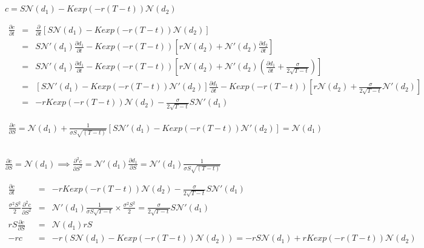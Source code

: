 \documentclass[11pt, fleqn]{article}
\begin{document}
\subsection{}
$c = S\mathcal{N}(d_1) - Kexp(-r(T-t))\mathcal{N}(d_2)$

\begin{eqnarray*}
\frac{\partial c}{\partial t} &=& \frac{\partial}{\partial t}[S\mathcal{N}(d_1) - Kexp(-r(T-t))\mathcal{N}(d_2)] \\
&=& S\mathcal{N}'(d_1)\frac{\partial d_1}{\partial t} - Kexp(-r(T-t))[r\mathcal{N}(d_2) + \mathcal{N}'(d_2)\frac{\partial d_2}{\partial t}]\\
&=& S\mathcal{N}'(d_1)\frac{\partial d_1}{\partial t} - Kexp(-r(T-t))[r\mathcal{N}(d_2) + \mathcal{N}'(d_2)(\frac{\partial d_1}{\partial t} + \frac{\sigma}{2\sqrt{T-t}})]\\
&=& [S\mathcal{N}'(d_1) - Kexp(-r(T-t))\mathcal{N}'(d_2)]\frac{\partial d_1}{\partial t} - Kexp(-r(T-t))[r\mathcal{N}(d_2) + \frac{\sigma}{2\sqrt{T-t}}\mathcal{N}'(d_2)]\\
&=& -rKexp(-r(T-t))\mathcal{N}(d_2) - \frac{\sigma}{2\sqrt{T-t}}S\mathcal{N}'(d_1)
\end{eqnarray*}

\begin{eqnarray*}
\frac{\partial c}{\partial S} = \mathcal{N}(d_1) + \frac{1}{\sigma S \sqrt{(T-t)}}[S\mathcal{N}'(d_1) - Kexp(-r(T-t))\mathcal{N}'(d_2)] = \mathcal{N}(d_1)
\end{eqnarray*}

\subsection{}
$
\frac{\partial c}{\partial S} = \mathcal{N}(d_1)
\implies \frac{\partial^2 c}{\partial S^2} = \mathcal{N}'(d_1)\frac{\partial d_1}{\partial S} = \mathcal{N}'(d_1)\frac{1}{\sigma S \sqrt{(T-t)}}
$

\begin{eqnarray*}
\frac{\partial c}{\partial t} &=& -rKexp(-r(T-t))\mathcal{N}(d_2) - \frac{\sigma}{2\sqrt{T-t}}S\mathcal{N}'(d_1) \\
\frac{\sigma^2S^2}{2}\frac{\partial^2 c}{\partial S^2} &=& \mathcal{N}'(d_1)\frac{1}{\sigma S \sqrt{T-t}}\times\frac{\sigma^2S^2}{2} = \frac{\sigma}{2\sqrt{T-t}}S\mathcal{N}'(d_1)\\
rS\frac{\partial c}{\partial S} &=& \mathcal{N}(d_1)rS\\
-rc &=& -r(S\mathcal{N}(d_1) - Kexp(-r(T-t))\mathcal{N}(d_2)) = -rS\mathcal{N}(d_1) + rKexp(-r(T-t))\mathcal{N}(d_2)
\end{eqnarray*}
\end{document}

